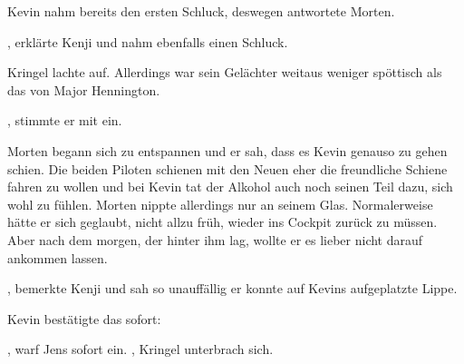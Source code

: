 Kevin nahm bereits den ersten Schluck, deswegen antwortete Morten. 

\par

, erklärte Kenji und nahm ebenfalls einen Schluck. 

\par

Kringel lachte auf. Allerdings war sein Gelächter weitaus weniger spöttisch als das von Major Hennington.

\par

, stimmte er mit ein.

\par

Morten begann sich zu entspannen und er sah, dass es Kevin genauso zu gehen schien. Die beiden Piloten schienen mit den Neuen eher die freundliche Schiene fahren zu wollen und bei Kevin tat der Alkohol auch noch seinen Teil dazu, sich wohl zu fühlen. Morten nippte allerdings nur an seinem Glas. Normalerweise hätte er sich geglaubt, nicht allzu früh, wieder ins Cockpit zurück zu müssen. Aber nach dem morgen, der hinter ihm lag, wollte er es lieber nicht darauf ankommen lassen.

\par

, bemerkte Kenji und sah so unauffällig er konnte auf Kevins aufgeplatzte Lippe.

\par

Kevin bestätigte das sofort: 

\par

, warf Jens sofort ein. , Kringel unterbrach sich. 

